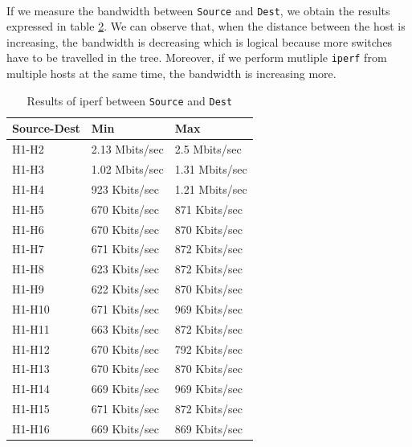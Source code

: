 \documentclass[a4paper, 11pt, oneside]{article}
\begin{document}
\begin{table}[H]
\paragraph{}If we measure the bandwidth between \texttt{Source} and \texttt{Dest}, we obtain the results expressed in table \ref{table:ST_bw}. We can observe that, when the distance between the host is increasing, the bandwidth is decreasing which is logical because more switches have to be travelled in the tree. Moreover, if we perform mutliple \texttt{iperf} from multiple hosts at the same time, the bandwidth is increasing more.

\begin{table}[H]
    \centering
    \begin{tabular}{|l|l|l|}
    \hline
    \textbf{Source-Dest} & \textbf{Min}   & \textbf{Max}   \\ \hline
    H1-H2                & 2.13 Mbits/sec & 2.5 Mbits/sec  \\ \hline
    H1-H3                & 1.02 Mbits/sec & 1.31 Mbits/sec \\ \hline
    H1-H4                & 923 Kbits/sec  & 1.21 Mbits/sec \\ \hline
    H1-H5                & 670 Kbits/sec  & 871 Kbits/sec  \\ \hline
    H1-H6                & 670 Kbits/sec  & 870 Kbits/sec  \\ \hline
    H1-H7                & 671 Kbits/sec  & 872 Kbits/sec  \\ \hline
    H1-H8                & 623 Kbits/sec  & 872 Kbits/sec  \\ \hline
    H1-H9                & 622 Kbits/sec  & 870 Kbits/sec  \\ \hline
    H1-H10               & 671 Kbits/sec  & 969 Kbits/sec  \\ \hline
    H1-H11               & 663 Kbits/sec  & 872 Kbits/sec  \\ \hline
    H1-H12               & 670 Kbits/sec  & 792 Kbits/sec  \\ \hline
    H1-H13               & 670 Kbits/sec  & 870 Kbits/sec  \\ \hline
    H1-H14               & 669 Kbits/sec  & 969 Kbits/sec  \\ \hline
    H1-H15               & 671 Kbits/sec  & 872 Kbits/sec  \\ \hline
    H1-H16               & 669 Kbits/sec  & 869 Kbits/sec  \\ \hline
    \end{tabular}
    \caption{Results of iperf between \texttt{Source} and \texttt{Dest}}
    \label{table:ST_bw}
    \end{table}


\end{table}
\end{document}
